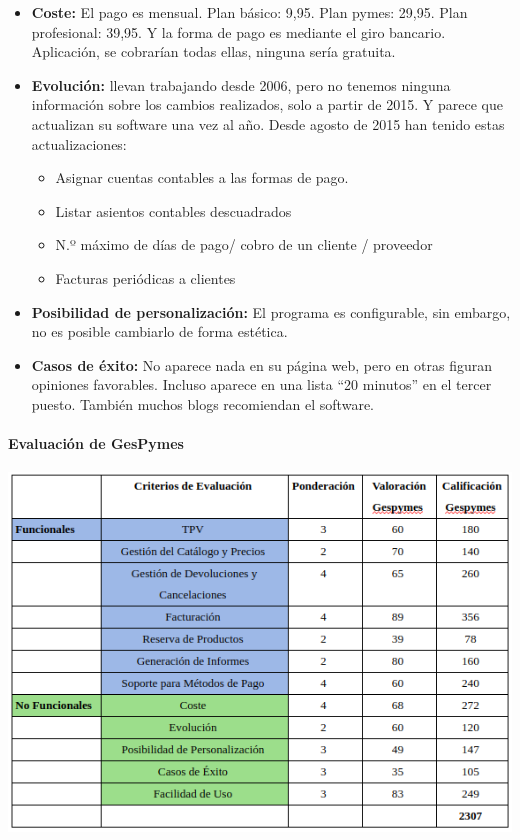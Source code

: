 \documentclass{article}
\begin{document}
\begin{itemize}

	\item \textbf{Coste:} El pago es mensual. Plan básico: 9,95. Plan pymes: 29,95. Plan profesional: 39,95. Y la forma de pago es mediante el giro bancario. Aplicación, se cobrarían todas ellas, ninguna sería gratuita.
	\item \textbf{Evolución:} llevan trabajando desde 2006, pero no tenemos ninguna información sobre los cambios realizados, solo a partir de 2015. Y parece que actualizan su software una vez al año. Desde agosto de 2015 han tenido estas actualizaciones:  

\begin{itemize}
	\item Asignar cuentas contables a las formas de pago. 
	\item Listar asientos contables descuadrados 
	\item N.º máximo de días de pago/ cobro de un cliente / proveedor 
	\item Facturas periódicas a clientes  
\end{itemize}
  
	\item \textbf{Posibilidad de personalización:} El programa es configurable, sin embargo, no es posible cambiarlo de forma estética.  
	\item \textbf{Casos de éxito:} No aparece nada en su página web, pero en otras figuran opiniones favorables. Incluso aparece en una lista “20 minutos” en el tercer puesto. También muchos blogs recomiendan el software.  

\end{itemize}

\paragraph{Evaluación de GesPymes}

\begin{flushleft}
	\includegraphics[scale=0.6]{imagenes/GespymesEv.png} 
\end{flushleft}
\end{document}
